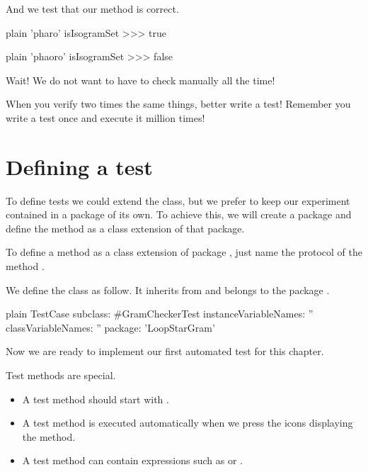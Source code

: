 \documentclass[10pt,twoside,english]{_support/latex/sbabook/sbabook}
\begin{document}
And we test that our method is correct. 

\begin{displaycode}{plain}
'pharo' isIsogramSet 
>>> true
\end{displaycode}

\begin{displaycode}{plain}
'phaoro' isIsogramSet 
>>> false
\end{displaycode}

Wait! We do not want to have to check manually all the time!

\begin{coffee}
When you verify two times the same things, better write a test! Remember you write  a test once and execute it million times!
\end{coffee}
\section{Defining a test}
To define tests we could extend the  class, but we prefer to keep our experiment contained in a package of its own. To achieve this, we will create a package  and define the  method as a class extension of that package.

\begin{important}
To define a method as a class extension of package , just name the protocol of the method .
\end{important}

We define the class  as follow. It inherits from  and belongs to the package .

\begin{displaycode}{plain}
TestCase subclass: #GramCheckerTest
	instanceVariableNames: ''
	classVariableNames: ''
	package: 'LoopStarGram'
\end{displaycode}

Now we are ready to implement our first automated test for this chapter. 

Test methods are special.

\begin{itemize}
\item A test method should start with .
\item A test method is executed automatically when we press the icons displaying the method.
\item A test method can contain expressions such as  or . 
\end{itemize}
\end{document}
